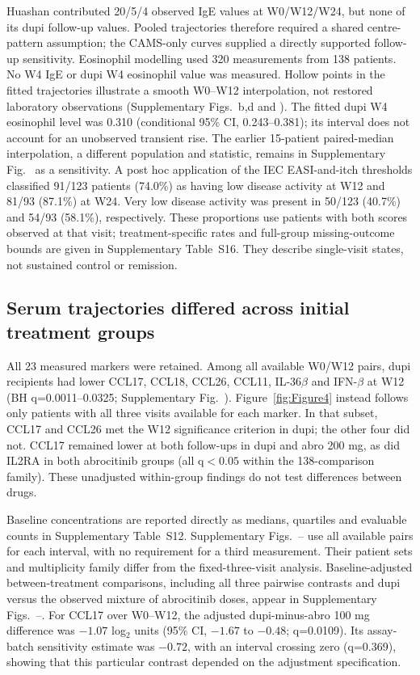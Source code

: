 Huashan contributed 20/5/4 observed IgE values at W0/W12/W24, but none of its dupi follow-up values. Pooled trajectories therefore required a shared centre-pattern assumption; the CAMS-only curves supplied a directly supported follow-up sensitivity. Eosinophil modelling used 320 measurements from 138 patients. No W4 IgE or dupi W4 eosinophil value was measured. Hollow points in the fitted trajectories illustrate a smooth W0--W12 interpolation, not restored laboratory observations (Supplementary Figs.~b,d and ). The fitted dupi W4 eosinophil level was 0.310 (conditional 95\% CI, 0.243--0.381); its interval does not account for an unobserved transient rise. The earlier 15-patient paired-median interpolation, a different population and statistic, remains in Supplementary Fig.~ as a sensitivity.
A post hoc application of the IEC EASI-and-itch thresholds classified 91/123 patients (74.0\%) as having low disease activity at W12 and 81/93 (87.1\%) at W24. Very low disease activity was present in 50/123 (40.7\%) and 54/93 (58.1\%), respectively. These proportions use patients with both scores observed at that visit; treatment-specific rates and full-group missing-outcome bounds are given in Supplementary Table~S16. They describe single-visit states, not sustained control or remission.

\subsection{Serum trajectories differed across initial treatment groups}
All 23 measured markers were retained. Among all available W0/W12 pairs, dupi recipients had lower CCL17, CCL18, CCL26, CCL11, IL-36$\beta$ and IFN-$\beta$ at W12 (BH q=0.0011--0.0325; Supplementary Fig.~). Figure~\ref{fig:Figure4} instead follows only patients with all three visits available for each marker. In that subset, CCL17 and CCL26 met the W12 significance criterion in dupi; the other four did not. CCL17 remained lower at both follow-ups in dupi and abro 200 mg, as did IL2RA in both abrocitinib groups (all q$<0.05$ within the 138-comparison family). These unadjusted within-group findings do not test differences between drugs.


Baseline concentrations are reported directly as medians, quartiles and evaluable counts in Supplementary Table~S12. Supplementary Figs.~-- use all available pairs for each interval, with no requirement for a third measurement. Their patient sets and multiplicity family differ from the fixed-three-visit analysis. Baseline-adjusted between-treatment comparisons, including all three pairwise contrasts and dupi versus the observed mixture of abrocitinib doses, appear in Supplementary Figs.~--. For CCL17 over W0--W12, the adjusted dupi-minus-abro 100 mg difference was $-1.07$ log$_2$ units (95\% CI, $-1.67$ to $-0.48$; q=0.0109). Its assay-batch sensitivity estimate was $-0.72$, with an interval crossing zero (q=0.369), showing that this particular contrast depended on the adjustment specification.

